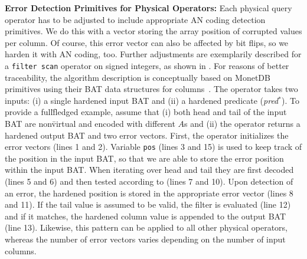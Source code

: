 \textbf{Error Detection Primitives for Physical Operators:}
Each physical query operator has to be adjusted to include appropriate AN coding detection primitives. We do this with a vector storing the array position of corrupted values per column. Of course, this error vector can also be affected by bit flips, so we harden it with AN coding, too. 
Further adjustments are exemplarily described for a \texttt{filter scan} operator on signed integers, as shown in . For reasons of better traceability, the algorithm description is conceptually based on MonetDB primitives using their BAT data structures for columns~\cite{DBLP:journals/vldb/BonczK99}. The operator takes two inputs: (i) a single hardened input BAT and (ii) a hardened predicate (\emph{pred}\(^*\)). To provide a full\=fledged example, assume that (i) both head and tail of the input BAT are non\=virtual and encoded with different \(A\)s and (ii) the operator returns a hardened output BAT and two error vectors. First, the operator initializes the error vectors (lines 1 and 2). Variable \texttt{pos} (lines 3 and 15) is used to keep track of the position in the input BAT, so that we are able to store the error position within the input BAT. When iterating over head and tail they are first decoded (lines 5 and 6) and then tested according to  (lines 7 and 10). Upon detection of an error, the hardened position is stored in the appropriate error vector (lines 8 and 11). If the tail value is assumed to be valid, the filter is evaluated (line 12) and if it matches, the hardened column value is appended to the output BAT (line 13). Likewise, this pattern can be applied to all other physical operators, whereas the number of error vectors varies depending on the number of input columns.


